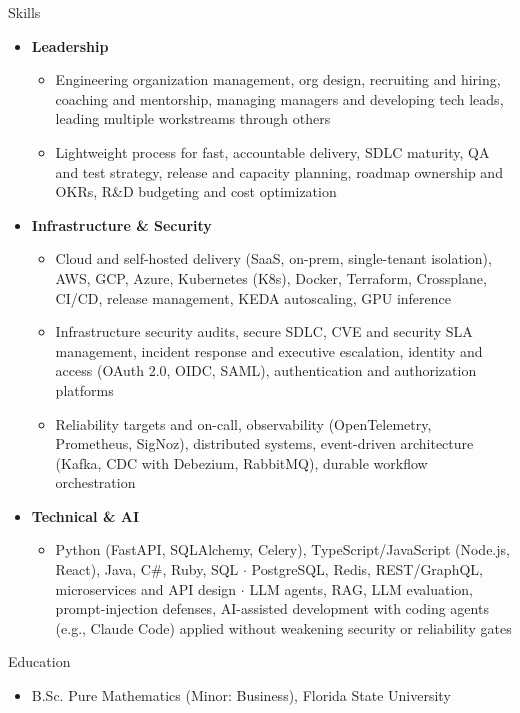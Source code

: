 \documentclass[10pt,oneside]{article}
\newenvironment{ressection}[1]{
  \vspace{4pt}
  {\fontfamily{phv}\selectfont\Large#1}
  \begin{itemize}
    \vspace{3pt}
}{
  \end{itemize}
}
\newcommand{\resitem}[1]{
  \vspace{-4pt}
\item \begin{flushleft} #1 \end{flushleft}
}
\newcommand{\ressubitem}[1]{
  \vspace{-1pt}
\item \begin{flushleft} #1 \end{flushleft}
}
\newenvironment{reslist}[1]{
  \resitem{\textbf{#1}}
  \vspace{-5pt}
  \begin{itemize}
}{
  \end{itemize}
}
\begin{document}
\begin{ressection}{Skills}
  \begin{reslist}{Leadership}
    \ressubitem{Engineering organization management, org design, recruiting and hiring, coaching and mentorship, managing managers and developing tech leads, leading multiple workstreams through others}
    \ressubitem{Lightweight process for fast, accountable delivery, SDLC maturity, QA and test strategy, release and capacity planning, roadmap ownership and OKRs, R\&D budgeting and cost optimization}
  \end{reslist}
  \begin{reslist}{Infrastructure \& Security}
    \ressubitem{Cloud and self-hosted delivery (SaaS, on-prem, single-tenant isolation), AWS, GCP, Azure, Kubernetes (K8s), Docker, Terraform, Crossplane, CI/CD, release management, KEDA autoscaling, GPU inference}
    \ressubitem{Infrastructure security audits, secure SDLC, CVE and security SLA management, incident response and executive escalation, identity and access (OAuth 2.0, OIDC, SAML), authentication and authorization platforms}
    \ressubitem{Reliability targets and on-call, observability (OpenTelemetry, Prometheus, SigNoz), distributed systems, event-driven architecture (Kafka, CDC with Debezium, RabbitMQ), durable workflow orchestration}
  \end{reslist}
  \begin{reslist}{Technical \& AI}
    \ressubitem{Python (FastAPI, SQLAlchemy, Celery), TypeScript/JavaScript (Node.js, React), Java, C\#, Ruby, SQL $\cdot$ PostgreSQL, Redis, REST/GraphQL, microservices and API design $\cdot$ LLM agents, RAG, LLM evaluation, prompt-injection defenses, AI-assisted development with coding agents (e.g., Claude Code) applied without weakening security or reliability gates}
  \end{reslist}
\end{ressection}

\begin{ressection}{Education}
  \ressubitem{B.Sc. Pure Mathematics (Minor: Business), Florida State University}
\end{ressection}
\end{document}
